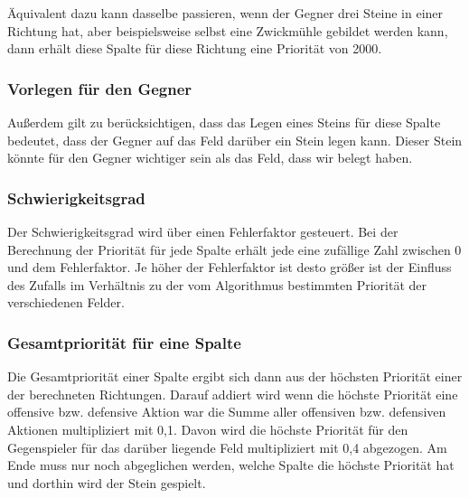 Äquivalent dazu kann dasselbe passieren, wenn der Gegner drei Steine in einer Richtung hat, aber beispielsweise selbst eine Zwickmühle gebildet werden kann, dann erhält diese Spalte für diese Richtung eine Priorität von 2000.

\subsubsection{Vorlegen für den Gegner}
Außerdem gilt zu berücksichtigen, dass das Legen eines Steins für diese Spalte bedeutet, dass der Gegner auf das Feld darüber ein Stein legen kann. Dieser Stein könnte für den Gegner wichtiger sein als das Feld, dass wir belegt haben.

\subsubsection{Schwierigkeitsgrad}
Der Schwierigkeitsgrad wird über einen Fehlerfaktor gesteuert. Bei der Berechnung der Priorität für jede Spalte erhält jede eine zufällige Zahl zwischen 0 und dem Fehlerfaktor. Je höher der Fehlerfaktor ist desto größer ist der Einfluss des Zufalls im Verhältnis zu der vom Algorithmus bestimmten Priorität der verschiedenen Felder.

\subsubsection{Gesamtpriorität für eine Spalte}
Die Gesamtpriorität einer Spalte ergibt sich dann aus der höchsten Priorität einer der berechneten Richtungen. Darauf addiert wird wenn die höchste Priorität eine offensive bzw. defensive Aktion war die Summe aller offensiven bzw. defensiven Aktionen multipliziert mit 0,1. Davon wird die höchste Priorität für den Gegenspieler für das darüber liegende Feld multipliziert mit 0,4 abgezogen.
Am Ende muss nur noch abgeglichen werden, welche Spalte die höchste Priorität hat und dorthin wird der Stein gespielt.